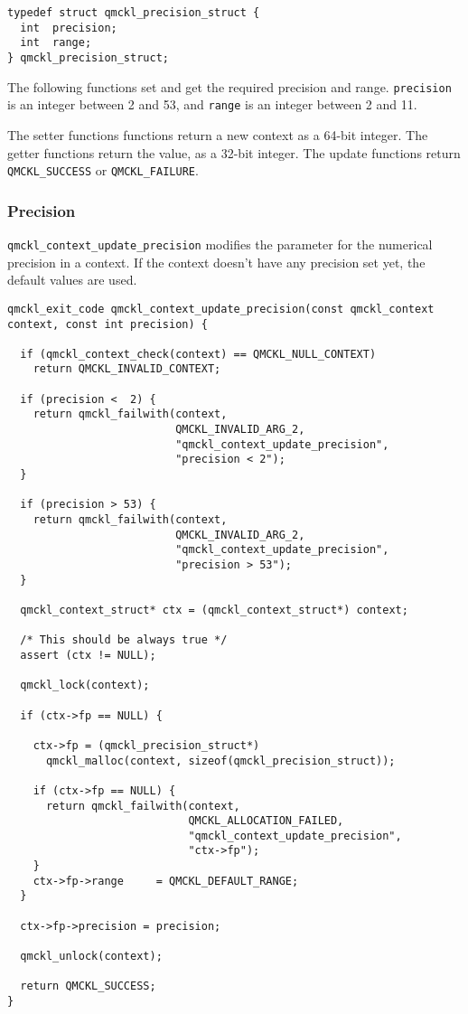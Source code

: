 \begin{verbatim}
typedef struct qmckl_precision_struct {
  int  precision;
  int  range;
} qmckl_precision_struct;
\end{verbatim}

The following functions set and get the required precision and
range. \texttt{precision} is an integer between 2 and 53, and \texttt{range} is an
integer between 2 and 11.

The setter functions functions return a new context as a 64-bit
integer. The getter functions return the value, as a 32-bit
integer. The update functions return \texttt{QMCKL\_SUCCESS} or
\texttt{QMCKL\_FAILURE}.

\subsubsection{Precision}
\label{sec:org6cf253c}
\texttt{qmckl\_context\_update\_precision} modifies the parameter for the
numerical precision in a context. If the context doesn't have any
precision set yet, the default values are used.

\begin{verbatim}
qmckl_exit_code qmckl_context_update_precision(const qmckl_context context, const int precision) {

  if (qmckl_context_check(context) == QMCKL_NULL_CONTEXT)
    return QMCKL_INVALID_CONTEXT;

  if (precision <  2) {
    return qmckl_failwith(context,
                          QMCKL_INVALID_ARG_2,
                          "qmckl_context_update_precision",
                          "precision < 2");
  }

  if (precision > 53) {
    return qmckl_failwith(context,
                          QMCKL_INVALID_ARG_2,
                          "qmckl_context_update_precision",
                          "precision > 53");
  }

  qmckl_context_struct* ctx = (qmckl_context_struct*) context;

  /* This should be always true */
  assert (ctx != NULL);

  qmckl_lock(context);

  if (ctx->fp == NULL) {

    ctx->fp = (qmckl_precision_struct*)
      qmckl_malloc(context, sizeof(qmckl_precision_struct));

    if (ctx->fp == NULL) {
      return qmckl_failwith(context,
                            QMCKL_ALLOCATION_FAILED,
                            "qmckl_context_update_precision",
                            "ctx->fp");
    }
    ctx->fp->range     = QMCKL_DEFAULT_RANGE;
  }

  ctx->fp->precision = precision;

  qmckl_unlock(context);

  return QMCKL_SUCCESS;
}
\end{verbatim}


